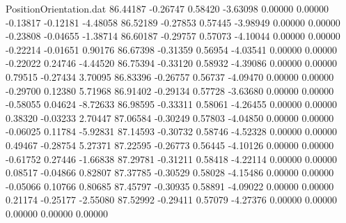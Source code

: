 \begin{filecontents}{PositionOrientation.dat}
  86.44187   -0.26747    0.58420    -3.63098    0.00000    0.00000   -0.13817   -0.12181   -4.48058
  86.52189   -0.27853    0.57445    -3.98949    0.00000    0.00000   -0.23808   -0.04655   -1.38714
  86.60187   -0.29757    0.57073    -4.10044    0.00000    0.00000   -0.22214   -0.01651    0.90176
  86.67398   -0.31359    0.56954    -4.03541    0.00000    0.00000   -0.22022    0.24746   -4.44520
  86.75394   -0.33120    0.58932    -4.39086    0.00000    0.00000    0.79515   -0.27434    3.70095
  86.83396   -0.26757    0.56737    -4.09470    0.00000    0.00000   -0.29700    0.12380    5.71968
  86.91402   -0.29134    0.57728    -3.63680    0.00000    0.00000   -0.58055    0.04624   -8.72633
  86.98595   -0.33311    0.58061    -4.26455    0.00000    0.00000    0.38320   -0.03233    2.70447
  87.06584   -0.30249    0.57803    -4.04850    0.00000    0.00000   -0.06025    0.11784   -5.92831
  87.14593   -0.30732    0.58746    -4.52328    0.00000    0.00000    0.49467   -0.28754    5.27371
  87.22595   -0.26773    0.56445    -4.10126    0.00000    0.00000   -0.61752    0.27446   -1.66838
  87.29781   -0.31211    0.58418    -4.22114    0.00000    0.00000    0.08517   -0.04866    0.82807
  87.37785   -0.30529    0.58028    -4.15486    0.00000    0.00000   -0.05066    0.10766    0.80685
  87.45797   -0.30935    0.58891    -4.09022    0.00000    0.00000    0.21174   -0.25177   -2.55080
  87.52992   -0.29411    0.57079    -4.27376    0.00000    0.00000    0.00000    0.00000    0.00000
\end{filecontents}
